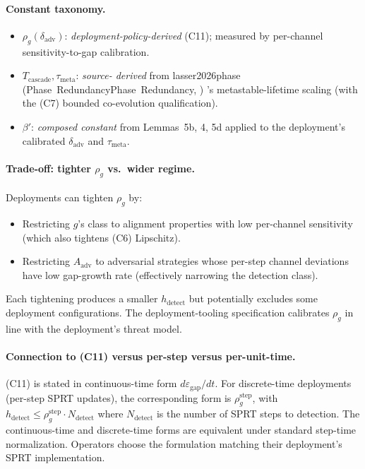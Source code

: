 \documentclass{article}
\makeatletter
\newcommand{\citep}[2][]{%
  \begingroup
  \def\@tmpkey{#2}%
  \ifx\@tmpkey\@empty\else
    (\ifx\@empty#1\@empty\else #1, \fi
     \@nameuse{bibkey@\@tmpkey})%
  \fi
  \endgroup
}
\newcommand{\Aadv}{A_{\mathrm{adv}}}
\newcommand{\deltaadv}{\delta_{\mathrm{adv}}}
\newcommand{\epsgap}{\varepsilon_{\mathrm{gap}}}
\makeatother
\begin{document}
\paragraph{Constant taxonomy.}
\begin{itemize}
\item $\rho_g(\deltaadv)$: \emph{deployment-policy-derived} (C11);
  measured by per-channel sensitivity-to-gap calibration.
\item $T_{\mathrm{cascade}}, \tau_{\mathrm{meta}}$: \emph{source-
  derived} from \citep[Phase~Redundancy]{lasser2026phase}'s
  metastable-lifetime scaling (with the (C7) bounded co-evolution
  qualification).
\item $\beta'$: \emph{composed constant} from Lemmas~5b, 4, 5d
  applied to the deployment's calibrated $\deltaadv$ and
  $\tau_{\mathrm{meta}}$.
\end{itemize}

\paragraph{Trade-off: tighter $\rho_g$ vs.\ wider regime.}
Deployments can tighten $\rho_g$ by:
\begin{itemize}
\item Restricting $g$'s class to alignment properties with low
  per-channel sensitivity (which also tightens (C6) Lipschitz).
\item Restricting $\Aadv$ to adversarial strategies whose per-step
  channel deviations have low gap-growth rate (effectively
  narrowing the detection class).
\end{itemize}
Each tightening produces a smaller $h_{\mathrm{detect}}$ but
potentially excludes some deployment configurations.  The
deployment-tooling specification calibrates $\rho_g$ in line with
the deployment's threat model.

\paragraph{Connection to (C11) versus per-step versus per-unit-time.}
(C11) is stated in continuous-time form $d\epsgap/dt$.  For
discrete-time deployments (per-step SPRT updates), the
corresponding form is $\rho_g^{\mathrm{step}}$, with
$h_{\mathrm{detect}} \leq \rho_g^{\mathrm{step}} \cdot
N_{\mathrm{detect}}$ where $N_{\mathrm{detect}}$ is the number of
SPRT steps to detection.  The continuous-time and discrete-time
forms are equivalent under standard step-time normalization.
Operators choose the formulation matching their deployment's SPRT
implementation.
\end{document}
